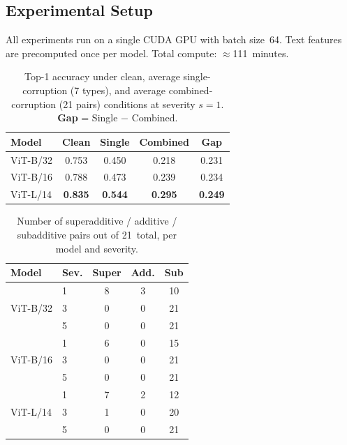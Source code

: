 \documentclass[10pt, twocolumn]{article}
\begin{document}
\subsection{Experimental Setup}
All experiments run on a single CUDA GPU with batch
size~64.
Text features are precomputed once per model.
Total compute: $\approx$111~minutes.

\begin{table}[t]
\caption{
  Top-1 accuracy under clean, average single-corruption
  (7 types), and average combined-corruption (21 pairs)
  conditions at severity $s=1$.
  \textbf{Gap} = Single $-$ Combined.
}
\label{tab:summary}
\centering
\small
\setlength{\tabcolsep}{5pt}
\begin{tabular}{lcccc}
\toprule
\textbf{Model}
  & \textbf{Clean}
  & \textbf{Single}
  & \textbf{Combined}
  & \textbf{Gap} \\
\midrule
ViT-B/32 & 0.753 & 0.450 & 0.218 & 0.231 \\
ViT-B/16 & 0.788 & 0.473 & 0.239 & 0.234 \\
ViT-L/14 & \textbf{0.835} & \textbf{0.544} & \textbf{0.295} & \textbf{0.249} \\
\bottomrule
\end{tabular}
\end{table}

\begin{table}[t]
\caption{
  Number of superadditive / additive / subadditive pairs
  out of 21~total, per model and severity.
}
\label{tab:counts}
\centering
\small
\begin{tabular}{llccc}
\toprule
\textbf{Model} & \textbf{Sev.}
  & \textbf{Super}
  & \textbf{Add.}
  & \textbf{Sub} \\
\midrule
\multirow{3}{*}{ViT-B/32}
  & 1 & 8 & 3 & 10 \\
  & 3 & 0 & 0 & 21 \\
  & 5 & 0 & 0 & 21 \\
\midrule
\multirow{3}{*}{ViT-B/16}
  & 1 & 6 & 0 & 15 \\
  & 3 & 0 & 0 & 21 \\
  & 5 & 0 & 0 & 21 \\
\midrule
\multirow{3}{*}{ViT-L/14}
  & 1 & 7 & 2 & 12 \\
  & 3 & 1 & 0 & 20 \\
  & 5 & 0 & 0 & 21 \\
\bottomrule
\end{tabular}
\end{table}
\end{document}
